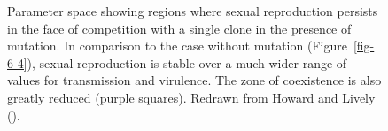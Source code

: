 \documentclass[
  letterpaper,
]{book}
\begin{document}
\begin{figure}


\caption[Parameter space showing regions where sexual reproduction
persists in the face of competition with a single clone in the presence
of mutation]{\label{fig-6-5}Parameter space showing regions where sexual
reproduction persists in the face of competition with a single clone in
the presence of mutation. In comparison to the case without mutation
(Figure~\ref{fig-6-4}), sexual reproduction is stable over a much wider
range of values for transmission and virulence. The zone of coexistence
is also greatly reduced (purple squares). Redrawn from Howard and Lively
().}

\end{figure}%
\end{document}
